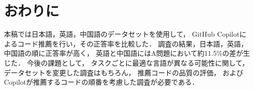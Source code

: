 \section{おわりに\label{conclusion}}
  本稿では日本語，英語，中国語のデータセットを使用して，
  GitHub Copilotによるコード推薦を行い，その正答率を比較した．
  調査の結果，日本語，英語，中国語の順に正答率が高く，
  英語と中国語にはA問題において約11.5\%の差が生じた．
  今後の課題として，
  タスクごとに最適な言語が異なる可能性に関して，
  データセットを変更した調査はもちろん，
  推薦コードの品質の評価，
  およびCopilotが推薦するコードの順番を考慮した調査が必要である．
  
